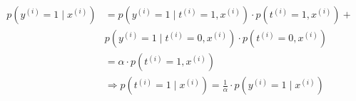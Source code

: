 \begin{answer}
    \begin{align*}
        p(y^{(i)}=1 \mid x^{(i)}) &= p(y^{(i)}=1 \mid t^{(i)}=1, x^{(i)})\cdot p(t^{(i)}=1, x^{(i)}) + \\
        &p(y^{(i)}=1 \mid t^{(i)}=0, x^{(i)})\cdot p(t^{(i)}=0, x^{(i)})  \\
        &= \alpha \cdot p(t^{(i)}=1, x^{(i)}) \\
        &\Rightarrow p(t^{(i)}=1 \mid x^{(i)}) = \frac{1}{\alpha}\cdot p(y^{(i)}=1 \mid x^{(i)})
    \end{align*}
\end{answer}

